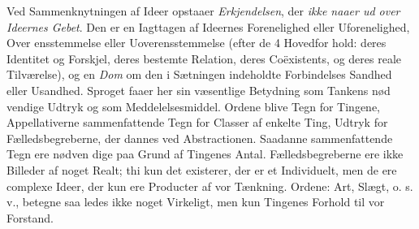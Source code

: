 \documentclass[12pt,a4paper]{book}
\begin{document}
Ved Sammenknytningen af Ideer opstaaer \emph{Erkjendelsen},
der \emph{ikke naaer ud over Ideernes Gebet}. Den er en
Iagttagen af Ideernes Forenelighed eller Uforenelighed, Over\-%
ensstemmelse eller Uoverensstemmelse (efter de 4 Hovedfor\-%
hold: deres Identitet og Forskjel, deres bestemte Relation, deres
Coëxistents, og deres reale Tilværelse), og en \emph{Dom} om den i
Sætningen indeholdte Forbindelses Sandhed eller Usandhed.
Sproget faaer her sin væsentlige Betydning som Tankens nød\-%
vendige Udtryk og som Meddelelsesmiddel. Ordene blive Tegn
for Tingene, Appellativerne sammenfattende Tegn for Classer
af enkelte Ting, Udtryk for Fælledsbegreberne, der dannes ved
Abstractionen. Saadanne sammenfattende Tegn ere nødven\-%
dige paa Grund af Tingenes Antal. Fælledsbegreberne ere
ikke Billeder af noget Realt; thi kun det existerer, der er et
Individuelt, men de ere complexe Ideer, der kun ere Producter
af vor Tænkning. Ordene: Art, Slægt, o. s. v., betegne saa\-%
ledes ikke noget Virkeligt, men kun Tingenes Forhold til vor
Forstand.
\end{document}
